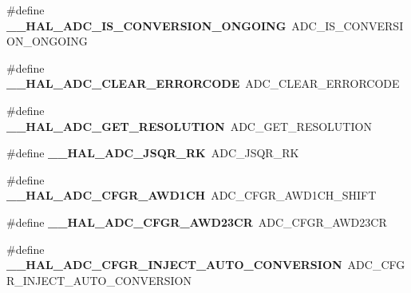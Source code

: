\begin{DoxyCompactItemize}
\item 
\mbox{\label{group___h_a_l___a_d_c___aliased___macros_ga64acf0d02a8ef5df5644c4232cef1fca}} 
\#define {\bfseries \+\_\+\+\_\+\+H\+A\+L\+\_\+\+A\+D\+C\+\_\+\+I\+S\+\_\+\+C\+O\+N\+V\+E\+R\+S\+I\+O\+N\+\_\+\+O\+N\+G\+O\+I\+NG}~A\+D\+C\+\_\+\+I\+S\+\_\+\+C\+O\+N\+V\+E\+R\+S\+I\+O\+N\+\_\+\+O\+N\+G\+O\+I\+NG
\item 
\mbox{\label{group___h_a_l___a_d_c___aliased___macros_ga18c93f7ab9df4bb73371bbe50a131d6d}} 
\#define {\bfseries \+\_\+\+\_\+\+H\+A\+L\+\_\+\+A\+D\+C\+\_\+\+C\+L\+E\+A\+R\+\_\+\+E\+R\+R\+O\+R\+C\+O\+DE}~A\+D\+C\+\_\+\+C\+L\+E\+A\+R\+\_\+\+E\+R\+R\+O\+R\+C\+O\+DE
\item 
\mbox{\label{group___h_a_l___a_d_c___aliased___macros_gaadc60b61ddd4d5572f3a4c6dbc0520a6}} 
\#define {\bfseries \+\_\+\+\_\+\+H\+A\+L\+\_\+\+A\+D\+C\+\_\+\+G\+E\+T\+\_\+\+R\+E\+S\+O\+L\+U\+T\+I\+ON}~A\+D\+C\+\_\+\+G\+E\+T\+\_\+\+R\+E\+S\+O\+L\+U\+T\+I\+ON
\item 
\mbox{\label{group___h_a_l___a_d_c___aliased___macros_ga3f3d0f19ef64dab8816b7e4d563da42c}} 
\#define {\bfseries \+\_\+\+\_\+\+H\+A\+L\+\_\+\+A\+D\+C\+\_\+\+J\+S\+Q\+R\+\_\+\+RK}~A\+D\+C\+\_\+\+J\+S\+Q\+R\+\_\+\+RK
\item 
\mbox{\label{group___h_a_l___a_d_c___aliased___macros_gaf2b93300d6c91bbe5a0253368ade466f}} 
\#define {\bfseries \+\_\+\+\_\+\+H\+A\+L\+\_\+\+A\+D\+C\+\_\+\+C\+F\+G\+R\+\_\+\+A\+W\+D1\+CH}~A\+D\+C\+\_\+\+C\+F\+G\+R\+\_\+\+A\+W\+D1\+C\+H\+\_\+\+S\+H\+I\+FT
\item 
\mbox{\label{group___h_a_l___a_d_c___aliased___macros_ga73200fff4fe5aa62989ea33522fa3cfc}} 
\#define {\bfseries \+\_\+\+\_\+\+H\+A\+L\+\_\+\+A\+D\+C\+\_\+\+C\+F\+G\+R\+\_\+\+A\+W\+D23\+CR}~A\+D\+C\+\_\+\+C\+F\+G\+R\+\_\+\+A\+W\+D23\+CR
\item 
\mbox{\label{group___h_a_l___a_d_c___aliased___macros_ga16b4ff7c58c0fe8141bd8bf6adf0f27c}} 
\#define {\bfseries \+\_\+\+\_\+\+H\+A\+L\+\_\+\+A\+D\+C\+\_\+\+C\+F\+G\+R\+\_\+\+I\+N\+J\+E\+C\+T\+\_\+\+A\+U\+T\+O\+\_\+\+C\+O\+N\+V\+E\+R\+S\+I\+ON}~A\+D\+C\+\_\+\+C\+F\+G\+R\+\_\+\+I\+N\+J\+E\+C\+T\+\_\+\+A\+U\+T\+O\+\_\+\+C\+O\+N\+V\+E\+R\+S\+I\+ON

\end{DoxyCompactItemize}
